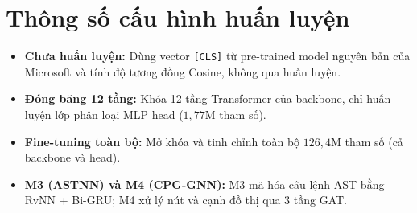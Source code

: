 \documentclass[11pt,a4paper]{article}
\begin{document}
\section{Thông số cấu hình huấn luyện}

\begin{table}[H]
\centering
\caption{Thông số huấn luyện các mô hình}
\label{tab:hyperparameters}
\end{table}

\begin{itemize}
\item \textbf{Chưa huấn luyện:} Dùng vector \texttt{[CLS]} từ pre-trained model nguyên bản của Microsoft và tính độ tương đồng Cosine, không qua huấn luyện.
\item \textbf{Đóng băng 12 tầng:} Khóa 12 tầng Transformer của backbone, chỉ huấn luyện lớp phân loại MLP head ($1,77\text{M}$ tham số).
\item \textbf{Fine-tuning toàn bộ:} Mở khóa và tinh chỉnh toàn bộ $126,4\text{M}$ tham số (cả backbone và head).
\item \textbf{M3 (ASTNN) và M4 (CPG-GNN):} M3 mã hóa câu lệnh AST bằng RvNN + Bi-GRU; M4 xử lý nút và cạnh đồ thị qua 3 tầng GAT.
\end{itemize}

\clearpage
\end{document}
